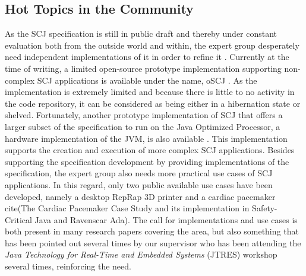 

\subsection{Hot Topics in the Community} %
\label{sub:interestingresearch}
As the SCJ specification is still in public draft and thereby under constant evaluation both from the outside world and within, the expert group desperately need independent implementations of it in order to refine it \cite{Schoeberl:2012:SCJonJava}. Currently at the time of writing, a limited open-source prototype implementation supporting non-complex SCJ applications is available under the name, oSCJ \cite{oSCJ}. As the implementation is extremely limited and because there is little to no activity in the code repository, it can be considered as being either in a hibernation state or shelved. Fortunately, another prototype implementation of SCJ that offers a larger subset of the specification to run on the Java Optimized Processor, a hardware implementation of the JVM, is also available \cite{Schoeberl:2012:SCJonJava}. This implementation supports the creation and execution of more complex SCJ applications. Besides supporting the specification development by providing implementations of the specification, the expert group also needs more practical use cases of SCJ applications. In this regard, only two public available use cases have been developed, namely a desktop RepRap 3D printer \cite{Schoeberl:2012:RepRap} and a cardiac pacemaker cite(The Cardiac Pacemaker Case Study and its implementation in Safety-Critical Java and Ravenscar Ada). The call for implementations and use cases is both present in many research papers covering the area, but also something that has been pointed out several times by our supervisor who has been attending the \textit{Java Technology for Real-Time and Embedded Systems} (JTRES) workshop several times, reinforcing the need.

